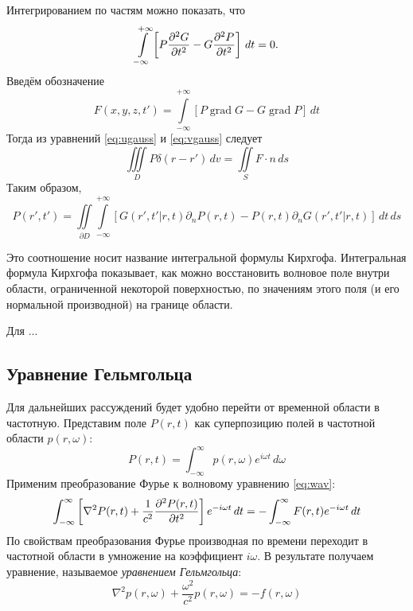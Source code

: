 \documentclass[a4paper, fontsize=14pt]{article}
\newcommand{\gradop}{\operatorname{grad}}
\begin{document}
	Интегрированием по частям можно показать, что 
	$$
	\int\limits_{-\infty}^{+\infty}\left[P\diff[2]{G}{t} - G \diff[2]{P}{t}\right]\,dt = 0.
	$$
	Введём обозначение 
	$$
		F(x,y,z,t') = \int\limits_{-\infty}^{+\infty} [P \gradop G - G \gradop P ]\, dt
	$$
	Тогда из уравнений \ref{eq:ugauss} и \ref{eq:vgauss} следует
	\begin{equation}
		\iiint\limits_D P\delta(r-r') \, dv = \iint\limits_S F \cdot n \, ds 
	\end{equation}
Таким образом, 
	\begin{equation}
		P(r',t') = \iint\limits_{\partial D} \int\limits_{-\infty}^{+\infty} 
	[G(r',t'|r,t)\partial_n P(r,t) 
	- P(r,t)\partial_n G(r',t'|r,t)] \,dt\,ds
	\label{eq:kir}
	\end{equation}
	
	
	Это соотношение носит название интегральной формулы Кирхгофа.
	Интегральная
	формула Кирхгофа показывает, как можно восстановить волновое поле внутри области,
	ограниченной некоторой поверхностью, по значениям этого поля (и его нормальной
	производной) на границе области.
	
	Для ...%

	\subsection{Уравнение Гельмгольца}
	Для дальнейших рассуждений будет удобно перейти от временной области в частотную. Представим поле $P(r,t)$ как суперпозицию полей в частотной области $p(r,\omega)$:
	\begin{equation}
		P(r,t) =  \int_{-\infty}^{\infty} p(r,\omega) e^{i\omega t}\, d\omega
	\end{equation}
	Применим преобразование Фурье к волновому уравнению \ref{eq:wav}:
	\begin{equation}
		\int_{-\infty}^{\infty} \left[ \nabla^2 P(r,t) + \frac{1}{c^2}\diff[2]{P(r,t)}{t}\right] e^{-i\omega t} \, dt = - \int_{-\infty}^{\infty}   F(r,t) e^{-i\omega t} \, dt
	\end{equation}
	По свойствам преобразования Фурье производная по времени переходит в частотной области в умножение на коэффициент 
	$i\omega$. В результате получаем уравнение, называемое {\it уравнением Гельмгольца}:
	\begin{equation}
		\nabla^2 p(r,\omega) + \frac{\omega^2}{c^2}p(r,\omega) = - f(r,\omega)
		\label{eq:helmholtz}
	\end{equation}
\end{document}
